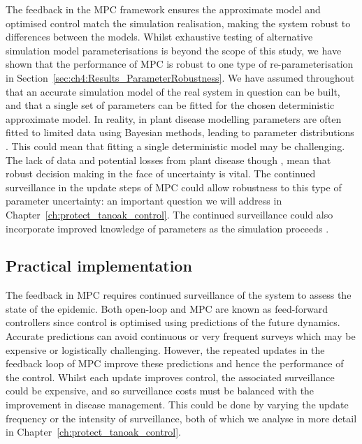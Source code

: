The feedback in the MPC framework ensures the approximate model and optimised control match the simulation realisation, making the system robust to differences between the models. Whilst exhaustive testing of alternative simulation model parameterisations is beyond the scope of this study, we have shown that the performance of MPC is robust to one type of re-parameterisation in Section~\ref{sec:ch4:Results_ParameterRobustness}. We have assumed throughout that an accurate simulation model of the real system in question can be built, and that a single set of parameters can be fitted for the chosen deterministic approximate model. In reality, in plant disease modelling parameters are often fitted to limited data using Bayesian methods, leading to parameter distributions \citep[e.g.][]{kleczkowski_parameter_2007, parry_bayesian_2014}. This could mean that fitting a single deterministic model may be challenging. The lack of data and potential losses from plant disease though \citep{savary_global_2019}, mean that robust decision making in the face of uncertainty is vital. The continued surveillance in the update steps of MPC could allow robustness to this type of parameter uncertainty: an important question we will address in Chapter~\ref{ch:protect_tanoak_control}. The continued surveillance could also incorporate improved knowledge of parameters as the simulation proceeds \citep{thompson_control_2018}.

\subsection{Practical implementation}

The feedback in MPC requires continued surveillance of the system to assess the state of the epidemic. Both open-loop and MPC are known as feed-forward controllers since control is optimised using predictions of the future dynamics. Accurate predictions can avoid continuous or very frequent surveys which may be expensive or logistically challenging. However, the repeated updates in the feedback loop of MPC improve these predictions and hence the performance of the control. Whilst each update improves control, the associated surveillance could be expensive, and so surveillance costs must be balanced with the improvement in disease management. This could be done by varying the update frequency or the intensity of surveillance, both of which we analyse in more detail in Chapter~\ref{ch:protect_tanoak_control}.

